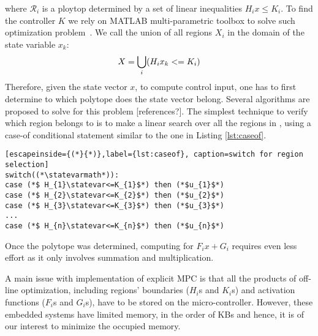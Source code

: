 where $\mathcal{R}_i$ is a ploytop determined by  a set of linear inequalities $H_ix\leq K_i$. To find the controller $K$ we rely on MATLAB multi-parametric toolbox to solve such optimization problem~\cite{matlabMPT, matlabYALMIP}. We call \statespace\space the union of all regions $X_{i}$ in the domain of the state variable $x_{k}$:
\begin{equation}
X = \bigcup_{i}(H_{i}x_{k}<=K_{i})
\end{equation}
Therefore, given the state vector $x$, to compute control input, one has to first determine to which polytope does the state vector belong. Several algorithms are proposed to solve for this problem [references?]. The simplest technique to verify which region \statevarmath belongs to is to make a linear search over all the regions in \statespace\space, using a case-of conditional statement similar to the one in Listing \ref{lst:caseof}.

\begin{lstlisting}[escapeinside={(*}{*)},label={lst:caseof}, caption=switch for region selection]
switch((*\statevarmath*)):
case (*$ H_{1}\statevar<=K_{1}$*) then (*$u_{1}$*)
case (*$ H_{2}\statevar<=K_{2}$*) then (*$u_{2}$*)
case (*$ H_{3}\statevar<=K_{3}$*) then (*$u_{3}$*)
...
case (*$ H_{n}\statevar<=K_{n}$*) then (*$u_{n}$*)
\end{lstlisting}
Once the polytope was determined, computing for $F_ix+G_i$ requires even less effort as it only involves summation and multiplication.  

A main issue with implementation of explicit MPC is that all the products of off-line optimization, including regions' boundaries ($H_i$s and $K_i$s) and activation functions ($F_i$s and $G_i$s), have to be stored on the micro-controller. However, these embedded systems have limited memory, in the order of KBs and hence, it is of our interest to minimize the occupied memory.